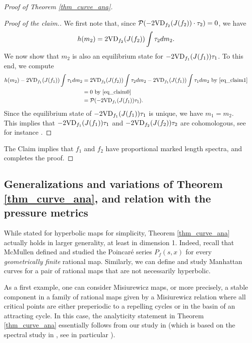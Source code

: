 \documentclass[11pt]{amsart}
\theoremstyle{plain}
\theoremstyle{definition}
\theoremstyle{remark}
\begin{document}
\begin{proof}[Proof of Theorem \ref{thm_curve_ana}]
\begin{proof}[Proof of the claim.]
We first note that,
since $\mathcal{P}(-2{\rm VD}_{f_2}(J(f_2))\cdot \tau_2) = 0$, we
have
\begin{equation} \label{eq_claim1}
h(m_2)=2{\rm VD}_{f_2}(J(f_2))\int \tau_2 dm_2.
\end{equation}
We now
show that $m_2$ is also an equilibrium state for $-2{\rm VD}_{f_1}(J(f_1))\tau_1$. 
To this end, we compute
\begin{align*}
h(m_2)-2{\rm VD}_{f_1}(J(f_1))\int \tau_1 dm_2
&= 2{\rm VD}_{f_2}(J(f_2))\int \tau_2 dm_2 -2{\rm VD}_{f_1}(J(f_1))\int \tau_1 dm_2 \text{ by } \eqref{eq_claim1}\\
&=0 \text{ by } \eqref{eq_claim0}\\
& = \mathcal{P}(-
2{\rm VD}_{f_1}(J(f_1))
\tau_1).
\end{align*}
Since the equilibrium state of $-
2{\rm VD}_{f_1}(J(f_1))
\tau_1$ is unique, we have $m_1=m_2$. This implies that $-
2{\rm VD}_{f_1}(J(f_1))\tau_1$ and 
$-
2{\rm VD}_{f_2}(J(f_2))
\tau_2$ are cohomologous, see for instance
\cite[Theorem 4.8]{Sarig09}. 
\end{proof}

The Claim implies that $f_1$ and $f_2$ have
proportional marked length spectra, and completes the proof.
\end{proof}


\subsection{Generalizations and variations of Theorem \ref{thm_curve_ana}, and relation with the pressure metrics} \label{sec_pressure}
While stated 
for hyperbolic maps for simplicity,
Theorem \ref{thm_curve_ana} actually holds in larger generality, at least in dimension 1.
Indeed, recall that 
McMullen \cite{McMullen00} defined and studied the Poincar\'e series $P_f(s,x)$ for every 
{\it geometrically finite} rational map. Similarly, we can define and study Manhattan curves for a pair of rational maps that are not necessarily hyperbolic. 

As a first example, one can consider 
Misiurewicz maps, or more precisely, a stable 
component in a family of rational maps given by a Misiurewicz relation where all critical points are either preperiodic to a repelling cycles or in the basin of an attracting cycle.
In this case, the analyticity statement 
in Theorem \ref{thm_curve_ana} essentially follows from our
study
in \cite{BH25} (which is based on the spectral study in \cite{MakSmir03},
see in particular \cite[Theorem 3.1 and Remark 3.3]{BH25}). 
\end{document}
